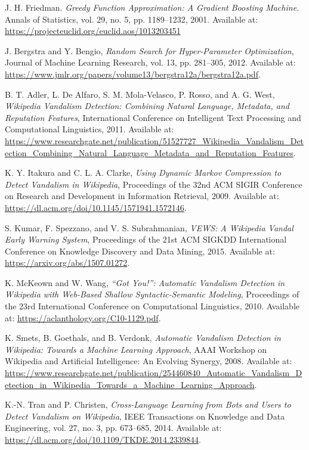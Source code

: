 \documentclass[
    13pt, %
    a4paper, %
    listof=totoc, %
    bibliography=totoc, %
    index=totoc, %
    headsepline
]{scrreprt}
\begin{document}
\begin{thebibliography}{9}
J. H. Friedman.
\textit{Greedy Function Approximation: A Gradient Boosting Machine.}
Annals of Statistics, vol. 29, no. 5, pp. 1189–1232, 2001.
Available at: \url{https://projecteuclid.org/euclid.aos/1013203451}

J. Bergstra and Y. Bengio, 
\textit{Random Search for Hyper-Parameter Optimization}, 
Journal of Machine Learning Research, vol. 13, pp. 281–305, 2012. Available at: \url{https://www.jmlr.org/papers/volume13/bergstra12a/bergstra12a.pdf}.

B. T. Adler, L. De Alfaro, S. M. Mola-Velasco, P. Rosso, and A. G. West, 
\textit{Wikipedia Vandalism Detection: Combining Natural Language, Metadata, and Reputation Features}, 
International Conference on Intelligent Text Processing and Computational Linguistics, 2011. Available at: \url{https://www.researchgate.net/publication/51527727_Wikipedia_Vandalism_Detection_Combining_Natural_Language_Metadata_and_Reputation_Features}.

K. Y. Itakura and C. L. A. Clarke, 
\textit{Using Dynamic Markov Compression to Detect Vandalism in Wikipedia}, 
Proceedings of the 32nd ACM SIGIR Conference on Research and Development in Information Retrieval, 2009. Available at: \url{https://dl.acm.org/doi/10.1145/1571941.1572146}.

S. Kumar, F. Spezzano, and V. S. Subrahmanian, 
\textit{VEWS: A Wikipedia Vandal Early Warning System}, 
Proceedings of the 21st ACM SIGKDD International Conference on Knowledge Discovery and Data Mining, 2015. Available at: \url{https://arxiv.org/abs/1507.01272}.

K. McKeown and W. Wang, 
\textit{“Got You!”: Automatic Vandalism Detection in Wikipedia with Web-Based Shallow Syntactic-Semantic Modeling}, 
Proceedings of the 23rd International Conference on Computational Linguistics, 2010. Available at: \url{https://aclanthology.org/C10-1129.pdf}.

K. Smets, B. Goethals, and B. Verdonk, 
\textit{Automatic Vandalism Detection in Wikipedia: Towards a Machine Learning Approach}, 
AAAI Workshop on Wikipedia and Artificial Intelligence: An Evolving Synergy, 2008. Available at: \url{https://www.researchgate.net/publication/254460840_Automatic_Vandalism_Detection_in_Wikipedia_Towards_a_Machine_Learning_Approach}.

K.-N. Tran and P. Christen, 
\textit{Cross-Language Learning from Bots and Users to Detect Vandalism on Wikipedia}, 
IEEE Transactions on Knowledge and Data Engineering, vol. 27, no. 3, pp. 673–685, 2014. Available at: \url{https://dl.acm.org/doi/10.1109/TKDE.2014.2339844}.


\end{thebibliography}
\end{document}
